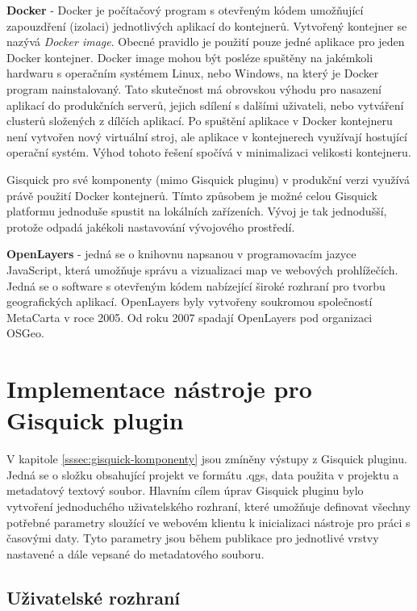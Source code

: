 \bigskip
\noindent
\textbf{Docker} - Docker je počítačový program s otevřeným
kódem umožňující zapouzdření (izolaci) jednotlivých aplikací do
kontejnerů. Vytvořený kontejner se nazývá \textit{Docker image}. Obecné
pravidlo je použití pouze jedné aplikace pro jeden Docker kontejner. Docker
image mohou být posléze spuštěny na jakémkoli hardwaru s operačním
systémem Linux, nebo Windows, na který je Docker program nainstalovaný. Tato
skutečnost má obrovskou výhodu pro nasazení aplikací do produkčních
serverů, jejich sdílení s dalšími uživateli, nebo vytváření
clusterů složených z dílčích aplikací. Po spuštění aplikace v
Docker kontejneru není vytvořen nový virtuální stroj, ale aplikace
v kontejnerech využívají hostující operační systém. Výhod tohoto
řešení spočívá v minimalizaci velikosti kontejneru.

Gisquick pro své komponenty (mimo Gisquick pluginu) v produkční
verzi využívá právě použití Docker kontejnerů. Tímto způsobem
je možné celou Gisquick platformu jednoduše spustit na lokálních
zařízeních. Vývoj je tak jednodušší, protože odpadá jakékoli
nastavování vývojového prostředí.

\bigskip
\noindent
\textbf{OpenLayers} - jedná se o knihovnu napsanou v programovacím
jazyce JavaScript, která umožňuje správu a vizualizaci map ve webových
prohlížečích. Jedná se o software s otevřeným kódem nabízející
široké rozhraní pro tvorbu geografických aplikací. OpenLayers byly
vytvořeny soukromou společností MetaCarta v roce 2005. Od roku 2007
spadají OpenLayers pod organizaci OSGeo.

\newpage
\section{Implementace nástroje pro Gisquick plugin}

V kapitole \ref{sssec:gisquick-komponenty} jsou zmíněny výstupy z Gisquick
pluginu. Jedná se o složku obsahující projekt ve formátu .qgs, data
použita v projektu a metadatový textový soubor. Hlavním cílem úprav
Gisquick pluginu bylo vytvoření jednoduchého uživatelského rozhraní,
které umožňuje definovat všechny potřebné parametry sloužící ve
webovém klientu k inicializaci nástroje pro práci s časovými daty. Tyto
parametry jsou během publikace pro jednotlivé vrstvy nastavené a dále
vepsané do metadatového souboru.

\subsection{Uživatelské rozhraní}
\label{sssec:plugin-ui}


